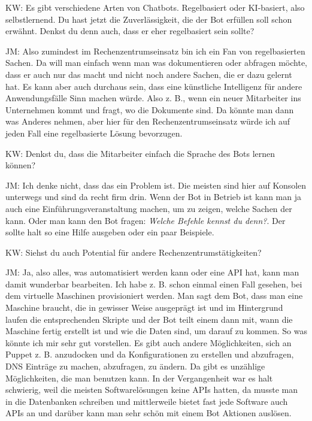\begin{list}{X:}{\setlength{\labelsep}{5mm}}
\item[KW:] Es gibt verschiedene Arten von Chatbots. Regelbasiert oder KI-basiert, also selbstlernend. Du hast jetzt die Zuverlässigkeit, die der Bot erfüllen soll schon erwähnt. Denkst du denn auch, dass er eher regelbasiert sein sollte?
\item[JM:] Also zumindest im Rechenzentrumseinsatz bin ich ein Fan von regelbasierten Sachen. Da will man einfach wenn man was dokumentieren oder abfragen möchte, dass er auch nur das macht und nicht noch andere Sachen, die er dazu gelernt hat. Es kann aber auch durchaus sein, dass eine künstliche Intelligenz für andere Anwendungsfälle Sinn machen würde. Also z. B., wenn ein neuer Mitarbeiter ins Unternehmen kommt und fragt, wo die Dokumente sind. Da könnte man dann was Anderes nehmen, aber hier für den Rechenzentrumseinsatz würde ich auf jeden Fall eine regelbasierte Lösung bevorzugen.
\item[KW:] Denkst du, dass die Mitarbeiter einfach die Sprache des Bots lernen können?
\item[JM:] Ich denke nicht, dass das ein Problem ist. Die meisten sind hier auf Konsolen unterwegs und sind da recht firm drin. Wenn der Bot in Betrieb ist kann man ja auch eine Einführungsveranstaltung machen, um zu zeigen, welche Sachen der kann. Oder man kann den Bot fragen: \textit{Welche Befehle kennst du denn?}. Der sollte halt so eine Hilfe ausgeben oder ein paar Beispiele.
\item[KW:] Siehst du auch Potential für andere Rechenzentrumstätigkeiten?
\item[JM:] Ja, also alles, was automatisiert werden kann oder eine API hat, kann man damit wunderbar bearbeiten. Ich habe z. B. schon einmal einen Fall gesehen, bei dem virtuelle Maschinen provisioniert werden. Man sagt dem Bot, dass man eine Maschine braucht, die in gewisser Weise ausgeprägt ist und im Hintergrund laufen die entsprechenden Skripte und der Bot teilt einem dann mit, wann die Maschine fertig erstellt ist und wie die Daten sind, um darauf zu kommen. So was könnte ich mir sehr gut vorstellen. Es gibt auch andere Möglichkeiten, sich an Puppet z. B. anzudocken und da Konfigurationen zu erstellen und abzufragen, DNS Einträge zu machen, abzufragen, zu ändern. Da gibt es unzählige Möglichkeiten, die man benutzen kann. In der Vergangenheit war es halt schwierig, weil die meisten Softwarelösungen keine APIs hatten, da musste man in die Datenbanken schreiben und mittlerweile bietet fast jede Software auch APIs an und darüber kann man sehr schön mit einem Bot Aktionen auslösen.

\end{list}
